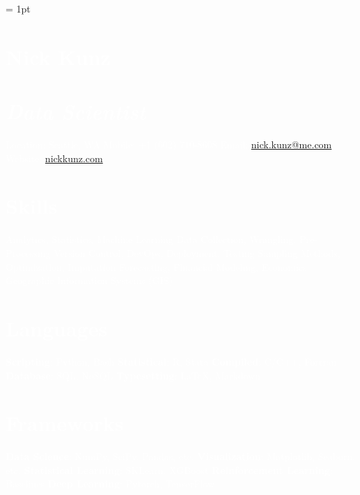 \documentclass{article}
\begin{document}
\noindent
\scriptsize
{}\font = 1pt
    \begin{bgbox}[
        height = \paperheight,
        width = 0.3\textwidth,
        colback = gray
    ]
        \textcolor{white}{
            \section*{Nick Kunz}
            \section*{\textit{\normalsize{Data Scientist}}}
                Location: \space\space\space Seattle, WA\newline
                Mobile: \space\space\space\space\space\space+1 $($602$)$ 710-8608\newline
                Email: \space\space\space\space\space\space\space\space\space\url{nick.kunz@me.com}\newline
                Website: \space\space\space\space\space\url{nickkunz.com}
            \section*{Skills}
                Analytics, Statistics, Machine Learning\newline
                Data Collection, Wrangling, Pre-Processing\newline
                Version Control, DevOps, Deployment, Testing\newline
                Sampling Methods, Optimization, Imputation\newline
                Forecasting, Financial Modeling, Economics\newline
                Geographic Information Systems (GIS)
            \section*{Languages}
                \textbf{Scripting}: Python, Bash\newline
                \textbf{Statistical}: R, Stata\newline
                \textbf{Compiled}: C/C++, Fortran\newline
                \textbf{Database}: SQL, NoSQL\newline
                \textbf{Typesetting}: \LaTeX, Markdown
            \section*{Frameworks}
                \textbf{Data Science}: NumPy, SciPy, Pandas, etc.\newline
                \textbf{Visualization}: Matplotlib, Seaborn, etc.\newline
                \textbf{Statistical Learning}: SKLearn, XGBoost\newline
                \textbf{Reinforcement Learning}: Baselines\newline
                \textbf{Deep Learning}: Pytorch, TensorFlow
}
\end{bgbox}
\end{document}
